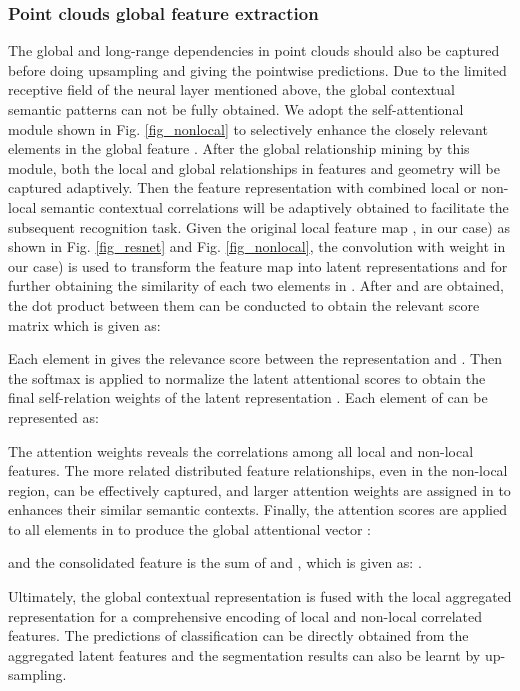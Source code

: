 \documentclass[journal]{IEEEtran}
\begin{document}
\subsubsection{Point clouds global feature extraction}
The global and long-range dependencies in point clouds should also be captured before doing upsampling and giving the pointwise predictions. Due to the limited receptive field of the neural layer mentioned above, the global contextual semantic patterns can not be fully obtained. We adopt the self-attentional module shown in Fig. \ref{fig_nonlocal} to selectively enhance the closely relevant elements in the global feature . After the global relationship mining by this module, both the local and global relationships in features and geometry will be captured adaptively. Then the feature representation with combined local or non-local semantic contextual correlations will be adaptively obtained to facilitate the subsequent recognition task.  Given the original local feature map ,  in our case) as shown in Fig. \ref{fig_resnet} and Fig. \ref{fig_nonlocal},  the  convolution with weight  in our case) is used to transform the feature map into latent representations  and  for further obtaining the similarity of each two elements in . After  and  are obtained, the dot product between them can be conducted to obtain the relevant score matrix  which is given as: 


Each element  in  gives the relevance score between the representation  and . Then the softmax is applied to normalize the latent attentional scores to obtain the final self-relation weights  of the latent representation . Each element  of  can be represented as:


The attention weights  reveals the correlations among all local and non-local features. The more related distributed feature relationships, even in the non-local region, can be effectively captured, and larger attention weights are assigned in  to enhances their similar semantic contexts. Finally, the attention scores are applied to all elements in  to produce the global attentional vector : 


and the consolidated feature  is the sum of  and , which is given as: .

Ultimately, the global contextual representation  is fused with the local aggregated representation  for a comprehensive encoding of local and non-local correlated features. The predictions of classification can be directly obtained from the aggregated latent features  and the segmentation results can also be learnt by up-sampling. 
\end{document}
